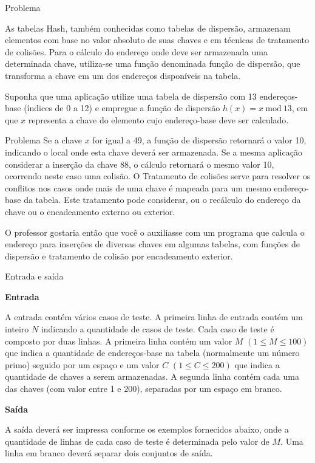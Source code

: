 
\begin{frame}[fragile]{Problema}

As tabelas Hash, também conhecidas como tabelas de dispersão, armazenam elementos com base no valor absoluto de suas chaves e em técnicas de tratamento de colisões. Para o cálculo do endereço onde deve ser armazenada uma determinada chave, utiliza-se uma função denominada função de dispersão, que transforma a chave em um dos endereços disponíveis na tabela.

Suponha que uma aplicação utilize uma tabela de dispersão com 13 endereços-base (índices de 0 a 12) e empregue a função de dispersão $h(x) = x\ \mbox{mod}\ 13$, em que $x$ representa a chave do elemento cujo endereço-base deve ser calculado.
\end{frame}

\begin{frame}[fragile]{Problema}
Se a chave $x$ for igual a 49, a função de dispersão retornará o valor 10, indicando o local onde esta chave deverá ser armazenada. Se a mesma aplicação considerar a inserção da chave 88, o cálculo retornará o mesmo valor 10, ocorrendo neste caso uma colisão. O Tratamento de colisões serve para resolver os conflitos nos casos onde mais de uma chave é mapeada para um mesmo endereço-base da tabela. Este tratamento pode considerar, ou o recálculo do endereço da chave ou o encadeamento externo ou exterior.

O professor gostaria então que você o auxiliasse com um programa que calcula o endereço para inserções de diversas chaves em algumas tabelas, com funções de dispersão e tratamento de colisão por encadeamento exterior.

\end{frame}

\begin{frame}[fragile]{Entrada e saída}

\textbf{Entrada}

A entrada contém vários casos de teste. A primeira linha de entrada contém um inteiro $N$ indicando 
a quantidade de casos de teste. Cada caso de teste é composto por duas linhas. A primeira linha 
contém um valor $M$ $(1\leq M\leq 100)$ que indica a quantidade de endereços-base na tabela 
(normalmente um número primo) seguido por um espaço e um valor $C$ $(1\leq C\leq 200)$ que indica a 
quantidade de chaves a serem armazenadas. A segunda linha contém cada uma das chaves (com valor 
entre 1 e 200), separadas por um espaço em branco.

\textbf{Saída}

A saída deverá ser impressa conforme os exemplos fornecidos abaixo, onde a quantidade de linhas de cada caso de teste é determinada pelo valor de $M$. Uma linha em branco deverá separar dois conjuntos de saída.

\end{frame}

